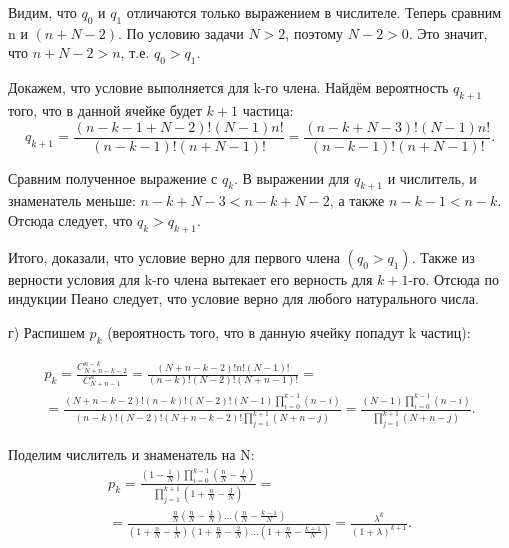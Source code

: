 \documentclass{book}
\begin{document}
Видим, что $ q_0 $ и $ q_1 $ отличаются только выражением в числителе.
Теперь сравним n и $ \left( n+N-2 \right)$.
По условию задачи $ N > 2 $, поэтому $ N - 2 > 0 $.
Это значит, что $ n + N - 2  > n $, т.е. $ q_0 > q_1 $.

Докажем, что условие выполняется для k-го члена.
Найдём вероятность $ q_{k+1} $ того, что в данной ячейке будет $ k + 1 $ частица:
$$ q_{k+1} =
\frac{ \left( n-k-1+N-2 \right)! \left( N-1 \right) n!}{ \left( n-k-1 \right)! \left( n+N-1 \right)!} =
\frac{ \left( n-k+N-3 \right)! \left( N-1 \right) n!}{ \left( n-k-1 \right)! \left( n+N-1 \right)!}.$$

Сравним полученное выражение с $ q_k $.
В выражении для $ q_{k+1} $ и числитель, и знаменатель меньше: $ n - k + N -3 < n - k + N - 2 $, а также $ n - k - 1 < n - k $.
Отсюда следует, что $ q_k > q_{k+1}$.

Итого, доказали, что условие верно для первого члена $ \left( q_0 > q_1 \right) $.
Также из верности условия для k-го члена вытекает его верность для $ k + 1 $-го.
Отсюда по индукции Пеано следует, что условие верно для любого натурального числа.

г) Распишем $ p_k $ (вероятность того, что в данную ячейку попадут k частиц):

\begin{equation*}
\begin{split}
p_k =
\frac{C_{N+n-k-2}^{n-k}}{C_{N+n-1}^n} =
\frac{ \left( N+n-k-2 \right)!n! \left( N-1 \right)!}{ \left( n-k \right)! \left( N-2 \right)! \left( N+n-1 \right)!} = \\
= \frac{ \left( N+n-k-2 \right)! \left( n-k \right)! \left( N-2 \right)! \left( N-1 \right) \prod \limits_{i=0}^{k-1} \left( n-i \right) }{ \left( n-k \right)! \left( N-2 \right)! \left( N+n-k-2 \right)! \prod \limits_{j=1}^{k+1} \left( N+n-j \right) } =
\frac{ \left( N-1 \right) \prod \limits_{i=0}^{k-1} \left( n-i \right) }{ \prod \limits_{j=1}^{k+1} \left( N+n-j \right) }.
\end{split}
\end{equation*}

Поделим числитель и знаменатель на N:
\begin{equation*}
\begin{split}
p_k =
\frac{ \left( 1- \frac{1}{N} \right) \prod \limits_{i=0}^{k-1} \left( \frac{n}{N} - \frac{i}{N} \right) }{ \prod \limits_{j=1}^{k+1} \left( 1+ \frac{n}{N} - \frac{j}{N} \right) } = \\
= \frac{ \frac{n}{N} \left( \frac{n}{N} - \frac{1}{N} \right) \dotsc \left( \frac{n}{N} - \frac{k-1}{N} \right) }{ \left( 1+ \frac{n}{N} - \frac{1}{N} \right) \left( 1+ \frac{n}{N} - \frac{2}{N} \right) \dotsc \left( 1+ \frac{n}{N} - \frac{k+1}{N} \right) } =
\frac{ \lambda^k}{ \left( 1+ \lambda \right)^{k+1}}.
\end{split}
\end{equation*}
\end{document}

